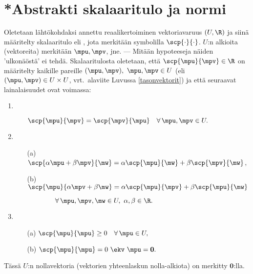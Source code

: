\section{*Abstrakti skalaaritulo ja normi} \label{abstrakti skalaaritulo}
\alku

Oletetaan lähtökohdaksi annettu reaalikertoiminen vektoriavaruus $(U,\R)$ ja siinä määritelty
skalaaritulo eli , jota merkitään symbolilla $\scp{\cdot}{\cdot}$. $U$:n alkioita
(vektoreita) merkitään $\mpu, \mpv$, jne. --- Mitään hypoteeseja näiden 'ulkonäöstä' ei tehdä.
Skalaaritulosta oletetaan, että $\scp{\mpu}{\mpv} \in \R$ on määritelty kaikille pareille 
$(\mpu, \mpv),\ \mpu,\mpv \in U$ (eli $(\mpu,\mpv) \in U \times U$, vrt.\ alaviite
Luvussa \ref{tasonvektorit}) ja että seuraavat lainalaisuudet ovat voimassa:
\begin{enumerate}
\item {} 
\begin{itemize}
\item[] $\scp{\mpu}{\mpv}=\scp{\mpv}{\mpu} \quad \forall\,\mpu,\mpv \in U.$
\end{itemize}
\item {} 
\begin{itemize}
\item[(a)] $\scp{\alpha \mpu + \beta \mpv}{\mw} 
                             = \alpha \scp{\mpu}{\mw} + \beta \scp{\mpv}{\mw}$,
\item[(b)] $\scp{\mpu}{\alpha \mpv + \beta \mw} 
                             = \alpha \scp{\mpu}{\mpv} + \beta \scp{\mpu}{\mw}$
\item[]    $\qquad\qquad\forall\,\mpu,\mpv,\mw \in U,\ \alpha,\beta\in\R.$
\end{itemize}
\item {} 
\begin{itemize}
\item[(a)] $\scp{\mpu}{\mpu} \ge 0 \quad \forall\,\mpu \in U,$
\item[(b)] $\scp{\mpu}{\mpu} = 0 \ \ekv \ \mpu = \mathbf{0}.$
\end{itemize}
\end{enumerate}
Tässä $U$:n nollavektoria (vektorien yhteenlaskun nolla-alkiota) on merkitty $\mathbf{0}$:lla.

